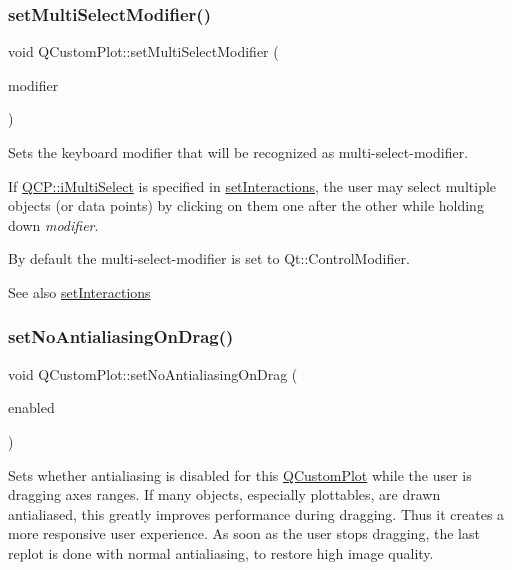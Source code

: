 \subsubsection{\texorpdfstring{set\+Multi\+Select\+Modifier()}{setMultiSelectModifier()}}
{\footnotesize\ttfamily void Q\+Custom\+Plot\+::set\+Multi\+Select\+Modifier (\begin{DoxyParamCaption}\item[{Qt\+::\+Keyboard\+Modifier}]{modifier }\end{DoxyParamCaption})}

Sets the keyboard modifier that will be recognized as multi-\/select-\/modifier.

If \mbox{\hyperlink{namespace_q_c_p_a2ad6bb6281c7c2d593d4277b44c2b037aef673112c5067c3cf4cfddb62da7265d}{Q\+C\+P\+::i\+Multi\+Select}} is specified in \mbox{\hyperlink{class_q_custom_plot_a5ee1e2f6ae27419deca53e75907c27e5}{set\+Interactions}}, the user may select multiple objects (or data points) by clicking on them one after the other while holding down {\itshape modifier}.

By default the multi-\/select-\/modifier is set to Qt\+::\+Control\+Modifier.

\begin{DoxySeeAlso}{See also}
\mbox{\hyperlink{class_q_custom_plot_a5ee1e2f6ae27419deca53e75907c27e5}{set\+Interactions}} 
\end{DoxySeeAlso}
\mbox{\label{class_q_custom_plot_a775bdcb6329d44701aeaa6135b0e5265}} 
\subsubsection{\texorpdfstring{set\+No\+Antialiasing\+On\+Drag()}{setNoAntialiasingOnDrag()}}
{\footnotesize\ttfamily void Q\+Custom\+Plot\+::set\+No\+Antialiasing\+On\+Drag (\begin{DoxyParamCaption}\item[{bool}]{enabled }\end{DoxyParamCaption})}

Sets whether antialiasing is disabled for this \mbox{\hyperlink{class_q_custom_plot}{Q\+Custom\+Plot}} while the user is dragging axes ranges. If many objects, especially plottables, are drawn antialiased, this greatly improves performance during dragging. Thus it creates a more responsive user experience. As soon as the user stops dragging, the last replot is done with normal antialiasing, to restore high image quality.

